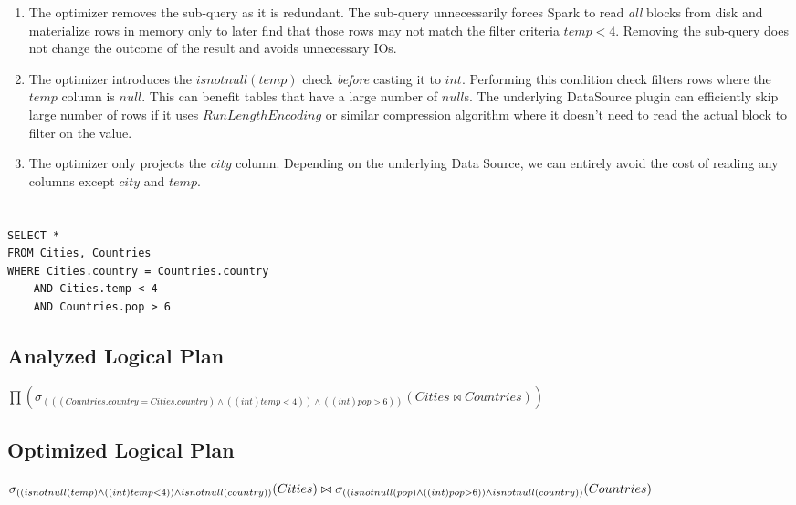 \documentclass[12pt]{article}
\begin{document}
\begin{enumerate}


\item The optimizer removes the sub-query as it is redundant. The sub-query unnecessarily forces Spark to read \textit{all} blocks from disk and materialize rows in memory only to later find that those rows may not match the filter criteria $temp < 4$. Removing the sub-query does not change the outcome of the result and avoids unnecessary IOs.

\item The optimizer introduces the $isnotnull(temp)$ check \textit{before} casting it to $int$. Performing this condition check filters rows where the $temp$ column is $null$. This can benefit tables that have a large number of $null$s. The underlying DataSource plugin can efficiently skip large number of rows if it uses $Run Length Encoding$ or similar compression algorithm where it doesn't need to read the actual block to filter on the value.

\item The optimizer only projects the $city$ column. Depending on the underlying Data Source, we can entirely avoid the cost of reading any columns except $city$ and $temp$.

\end{enumerate}

\newpage

\section{}
\begin{verbatim}
SELECT *
FROM Cities, Countries
WHERE Cities.country = Countries.country
    AND Cities.temp < 4
    AND Countries.pop > 6
\end{verbatim}

\subsection*{Analyzed Logical Plan}

$\prod(\sigma_{(((Countries.country = Cities.country) \wedge ((int)temp < 4))  \wedge ((int)pop > 6))}(Cities \bowtie Countries))$



\subsection*{Optimized Logical Plan}

$\sigma_{((isnotnull(temp) \wedge ((int)temp < 4)) \wedge isnotnull(country))}(Cities) \bowtie \\
\sigma_{((isnotnull(pop) \wedge ((int)pop > 6)) \wedge isnotnull(country))}(Countries)$
\end{document}
